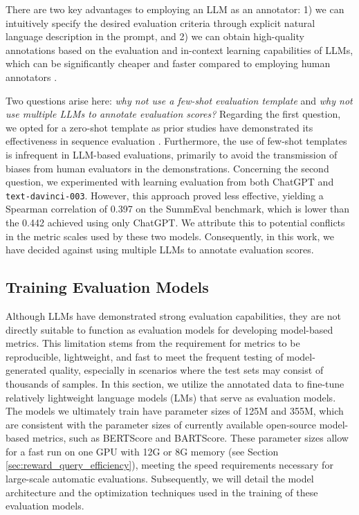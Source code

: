 \documentclass[lettersize,journal]{IEEEtran}
\begin{document}
There are two key advantages to employing an LLM as an annotator: 1) we can intuitively specify the desired evaluation criteria through explicit natural language description in the prompt, and  2) we can obtain high-quality annotations based on the evaluation and in-context learning capabilities of LLMs, which can be significantly cheaper and faster compared to employing human annotators \cite{ding2022gpt, kang2023distill, chiang2023large}.

Two questions arise here: \textit{why not use a few-shot evaluation template} and \textit{why not use multiple LLMs to annotate evaluation scores?} Regarding the first question, we opted for a zero-shot template as prior studies have demonstrated its effectiveness in sequence evaluation \cite{wang2023chatgpt, liu2023gpteval}. Furthermore, the use of few-shot templates is infrequent in LLM-based evaluations, primarily to avoid the transmission of biases from human evaluators in the demonstrations. Concerning the second question, we experimented with learning evaluation from both ChatGPT and \texttt{text-davinci-003}. However, this approach proved less effective, yielding a Spearman correlation of 0.397 on the SummEval benchmark, which is lower than the 0.442 achieved using only ChatGPT. We attribute this to potential conflicts in the metric scales used by these two models. Consequently, in this work, we have decided against using multiple LLMs to annotate evaluation scores.


\subsection{Training Evaluation Models}
\label{sec:training-eval-models}
Although LLMs have demonstrated strong evaluation capabilities, they are not directly suitable to function as evaluation models for developing model-based metrics. This limitation stems from the requirement for metrics to be reproducible, lightweight, and fast to meet the frequent testing of model-generated quality, especially in scenarios where the test sets may consist of thousands of samples. In this section, we utilize the annotated data to fine-tune relatively lightweight language models (LMs) that serve as evaluation models. The models we ultimately train have parameter sizes of 125M and 355M, which are consistent with the parameter sizes of currently available open-source model-based metrics, such as BERTScore and BARTScore. These parameter sizes allow for a fast run on one GPU with 12G or 8G memory (see Section \ref{sec:reward_query_efficiency}), meeting the speed requirements necessary for large-scale automatic evaluations. Subsequently, we will detail the model architecture and the optimization techniques used in the training of these evaluation models.
\end{document}
